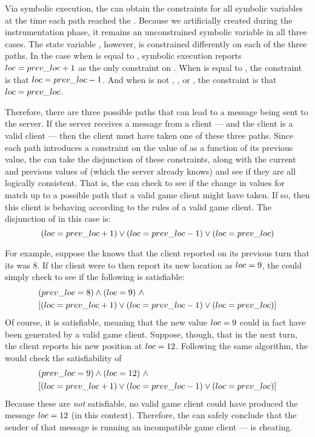 Via symbolic execution, the \verifier can obtain the constraints for all
symbolic variables at the time each path reached the \toybreak.
Because we artificially created \toyoldloc during the instrumentation
phase, it remains an unconstrained symbolic variable in all three
cases.  The state variable \toyloc, however, is constrained
differently on each of the three paths.  In the case when \toykey is
equal to \toyup, symbolic execution reports $loc = prev\_loc+1$
as the only constraint on \toyloc.  When \toykey is equal to \toydown,
the constraint is that $loc = prev\_loc-1$.  And when \toykey is
not \toyup, \toydown, or \toyesc, the constraint is that $loc =
prev\_loc$.

Therefore, there are three possible paths that can lead to a
message being sent to the server.  If the server receives a message
from a client --- and the client is a valid client --- then the client
must have taken one of these three paths.  Since each path
introduces a constraint on the value of \toyloc as a function of its
previous value, the \verifier can take the disjunction of these
constraints, along with the current and previous values of \toyloc
(which the server already knows) and see if they are all logically
consistent.  That is, the \verifier can check to see if the change in
values for \toyloc match up to a possible path that a valid game
client might have taken.  If so, then this client is behaving
according to the rules of a valid game client.  The disjunction of
\pathsegcons in this case is:
\begin{equation}
(loc = prev\_loc+1) \vee (loc = prev\_loc-1) \vee 
(loc = prev\_loc)
\label{eqn:toyconstraints}
\end{equation}

For example, suppose the \verifier knows that the client reported
on its previous turn that its \toyloc was 8.  If the client were to
then report its new location as $loc=9$, the \verifier could
simply check to see if the following is satisfiable:
\begin{align*}
& (prev\_loc = 8) \wedge (loc = 9)~\wedge \\
& [(loc = prev\_loc+1) \vee (loc = prev\_loc-1) \vee
   (loc = prev\_loc)]
\end{align*}
\noindent Of course, it is satisfiable, meaning that the new value
$loc=9$ could in fact have been generated by a valid game client.
Suppose, though, that in the next turn, the client reports his new
position at $loc=12$.  Following the same algorithm, the \verifier
would check the satisfiability of
\begin{align*}
& (prev\_loc = 9) \wedge (loc = 12)~\wedge \\
& [(loc = prev\_loc+1) \vee (loc = prev\_loc-1) \vee
   (loc = prev\_loc) ]
\end{align*}
Because these \pathsegcons are {\em not} satisfiable, no valid game
client could have produced the message $loc=12$ (in this context).
Therefore, the \verifier can safely conclude that the sender of that
message is running an incompatible game client --- is cheating.

